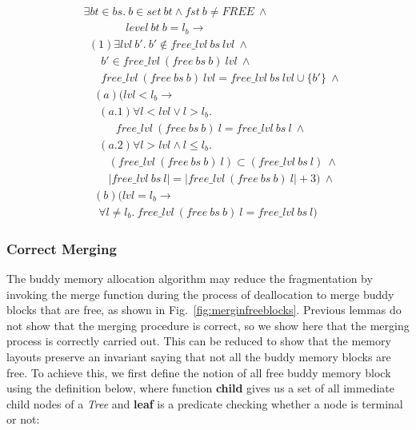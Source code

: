 \begin{lemma} 
\label{lemma:free_deallocation}
\end{lemma}
\begin{align*}
&\exists bt \in bs.\ b \in set\ bt \wedge fst\ b \neq FREE\ \wedge\\
&\ \ \ \ \ \ \ \ \ \ \ \ \ \ \ \ \ level\ bt\ b = l_b \longrightarrow\\
&\ \ (1)\exists lvl\ b'.\ b' \notin free\_lvl\ bs\ lvl\ \wedge  \\
&\ \ \ \ \ \ \ b' \in free\_lvl\ (free\ bs\ b)\ lvl\ \wedge\\
&\ \ \ \ \ \ \ free\_lvl\ (free\ bs\ b)\ lvl = free\_lvl\ bs\ lvl \cup \lbrace b' \rbrace\ \wedge \\
& \ \ \ \ (a)(lvl < l_b \longrightarrow \\
&\ \ \ \ \ \ (a.1)\forall l < lvl \vee l > l_b.\ \\ 
&\ \ \ \ \ \ \ \ \ \ \ \ \ free\_lvl\ (free\ bs\ b)\ l = free\_lvl\ bs\ l\ \wedge\\
&\ \ \ \ \ \ (a.2)\forall l > lvl \wedge l \le l_b. \\
&\ \ \ \ \ \ \ \ \ \ (free\_lvl\ (free\ bs\ b)\ l) \subset (free\_lvl\ bs\ l)\ \wedge\\
&\ \ \ \ \ \ \ \ \ \ |free\_lvl\ bs\ l| = |free\_lvl\ (free\ bs\ b)\ l| + 3)\ \wedge\\
& \ \ \ \ (b)(lvl = l_b \longrightarrow \\
&\ \ \ \ \ \ \forall l \ne l_b.\ free\_lvl\ (free\ bs\ b)\ l = free\_lvl\ bs\ l)
\end{align*}

\subsubsection{Correct Merging}
The buddy memory allocation algorithm may reduce the fragmentation by invoking the merge function during the process of deallocation to merge buddy blocks that are free, as shown in Fig.~\ref{fig:merginfreeblocks}. Previous lemmas do not show that the merging procedure is correct, so we show here that the merging process is correctly carried out. This can be reduced to show that the memory layouts preserve an invariant saying that not all the buddy memory blocks are free. To achieve this, we first define the notion of all free buddy memory block using the definition below, where function \textbf{child} gives us a set of all immediate child nodes of a \emph{Tree} and \textbf{leaf} is a predicate checking whether a node is terminal or not:


